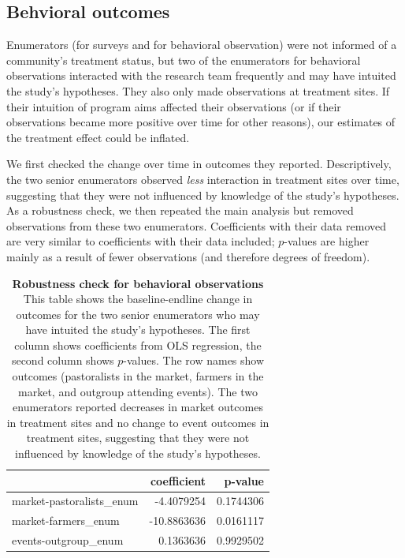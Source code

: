 \documentclass[
]{article}
\begin{document}
\hypertarget{behvioral-outcomes}{%
\subsection{Behvioral outcomes}\label{behvioral-outcomes}}

Enumerators (for surveys and for behavioral observation) were not
informed of a community's treatment status, but two of the enumerators
for behavioral observations interacted with the research team frequently
and may have intuited the study's hypotheses. They also only made
observations at treatment sites. If their intuition of program aims
affected their observations (or if their observations became more
positive over time for other reasons), our estimates of the treatment
effect could be inflated.

We first checked the change over time in outcomes they reported.
Descriptively, the two senior enumerators observed \emph{less}
interaction in treatment sites over time, suggesting that they were not
influenced by knowledge of the study's hypotheses. As a robustness
check, we then repeated the main analysis but removed observations from
these two enumerators. Coefficients with their data removed are very
similar to coefficients with their data included; \(p\)-values are
higher mainly as a result of fewer observations (and therefore degrees
of freedom).

\begin{table}[H]
\begin{center}
\label{tab:behObs_enumsOnly_tab}
\caption{\textbf{Robustness check for behavioral observations} This table shows the baseline-endline change in outcomes for the two senior enumerators who may have intuited the study's hypotheses. The first column shows coefficients from OLS regression, the second column shows $p$-values. The row names show outcomes (pastoralists in the market, farmers in the market, and outgroup attending events). The two enumerators reported decreases in market outcomes in treatment sites and no change to event outcomes in treatment sites, suggesting that they were not influenced by knowledge of the study's hypotheses.}
\smallskip

\begin{tabular}{l|r|r}
\hline
  & coefficient & p-value\\
\hline
market-pastoralists\_enum & -4.4079254 & 0.1744306\\
\hline
market-farmers\_enum & -10.8863636 & 0.0161117\\
\hline
events-outgroup\_enum & 0.1363636 & 0.9929502\\
\hline
\end{tabular}


\end{center}
\end{table}
\end{document}
